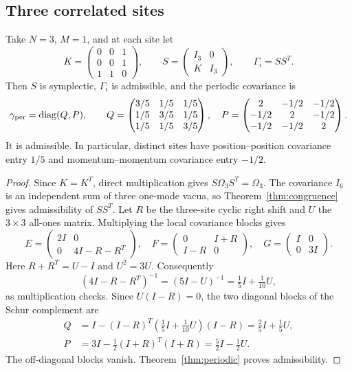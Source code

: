\subsection{Three correlated sites}
\begin{example}\label{prop:three-site}
Take $N=3$, $M=1$, and at each site let
\[
 K=\begin{pmatrix}0&0&1\\0&0&1\\1&1&0\end{pmatrix},\qquad
 S=\begin{pmatrix}I_3&0\\K&I_3\end{pmatrix},\qquad \Gamma_i=SS^T.
\]
Then $S$ is symplectic, $\Gamma_i$ is admissible, and the periodic covariance is
\[
 \gamma_{\rm per}=\operatorname{diag}(Q,P),\qquad
 Q=\begin{pmatrix}3/5&1/5&1/5\\1/5&3/5&1/5\\1/5&1/5&3/5\end{pmatrix},\quad
 P=\begin{pmatrix}2&-1/2&-1/2\\-1/2&2&-1/2\\-1/2&-1/2&2\end{pmatrix}.
\]
It is admissible. In particular, distinct sites have position--position covariance
entry $1/5$ and momentum--momentum covariance entry $-1/2$.
\end{example}
\begin{proof}
Since $K=K^T$, direct multiplication gives $S\Omega_3S^T=\Omega_3$.
The covariance $I_6$ is an independent sum of three one-mode vacua, so
Theorem~\ref{thm:congruence} gives admissibility of $SS^T$.
Let $R$ be the three-site cyclic right shift and $U$ the $3\times3$ all-ones
matrix. Multiplying the local covariance blocks gives
\[
 E=\begin{pmatrix}2I&0\\0&4I-R-R^T\end{pmatrix},\quad
 F=\begin{pmatrix}0&I+R\\I-R&0\end{pmatrix},\quad
 G=\begin{pmatrix}I&0\\0&3I\end{pmatrix}.
\]
Here $R+R^T=U-I$ and $U^2=3U$. Consequently
\[
 (4I-R-R^T)^{-1}=(5I-U)^{-1}=\tfrac15 I+\tfrac1{10}U,
\]
as multiplication checks. Since $U(I-R)=0$, the two diagonal blocks of
the Schur complement are
\begin{align*}
 Q&=I-(I-R)^T(\tfrac15I+\tfrac1{10}U)(I-R)
   =\tfrac25I+\tfrac15U,\\
 P&=3I-\tfrac12(I+R)^T(I+R)=\tfrac52I-\tfrac12U.
\end{align*}
The off-diagonal blocks vanish. Theorem~\ref{thm:periodic} proves admissibility.
\end{proof}

